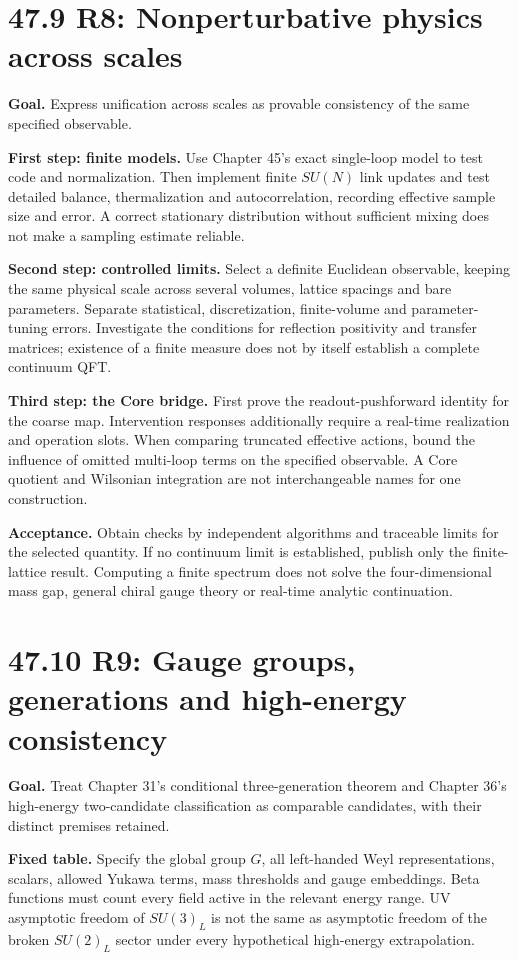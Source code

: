 \documentclass[
  11pt,
  oneside]{book}
\begin{document}
\section{47.9 R8: Nonperturbative physics across scales}

\textbf{Goal.} Express unification across scales as provable consistency
of the same specified observable.

\textbf{First step: finite models.} Use Chapter 45's exact single-loop
model to test code and normalization. Then implement finite \(SU(N)\)
link updates and test detailed balance, thermalization and
autocorrelation, recording effective sample size and error. A correct
stationary distribution without sufficient mixing does not make a
sampling estimate reliable.

\textbf{Second step: controlled limits.} Select a definite Euclidean
observable, keeping the same physical scale across several volumes,
lattice spacings and bare parameters. Separate statistical,
discretization, finite-volume and parameter-tuning errors. Investigate
the conditions for reflection positivity and transfer matrices;
existence of a finite measure does not by itself establish a complete
continuum QFT.

\textbf{Third step: the Core bridge.} First prove the
readout-pushforward identity for the coarse map. Intervention responses
additionally require a real-time realization and operation slots. When
comparing truncated effective actions, bound the influence of omitted
multi-loop terms on the specified observable. A Core quotient and
Wilsonian integration are not interchangeable names for one
construction.

\textbf{Acceptance.} Obtain checks by independent algorithms and
traceable limits for the selected quantity. If no continuum limit is
established, publish only the finite-lattice result. Computing a finite
spectrum does not solve the four-dimensional mass gap, general chiral
gauge theory or real-time analytic continuation.

\section{47.10 R9: Gauge groups, generations and high-energy
consistency}

\textbf{Goal.} Treat Chapter 31's conditional three-generation theorem
and Chapter 36's high-energy two-candidate classification as comparable
candidates, with their distinct premises retained.

\textbf{Fixed table.} Specify the global group \(G\), all left-handed
Weyl representations, scalars, allowed Yukawa terms, mass thresholds and
gauge embeddings. Beta functions must count every field active in the
relevant energy range. UV asymptotic freedom of \(SU(3)_L\) is not the
same as asymptotic freedom of the broken \(SU(2)_L\) sector under every
hypothetical high-energy extrapolation.
\end{document}

